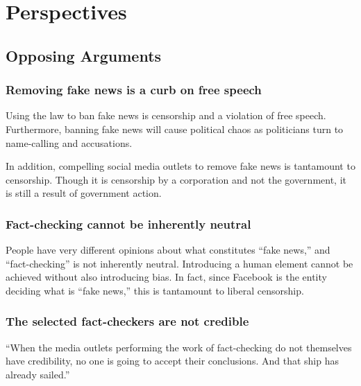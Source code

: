 
\section{Perspectives}

\subsection{Opposing Arguments}

\subsubsection{Removing fake news is a curb on free speech}

\par Using the law to ban fake news is censorship and a violation of free speech. Furthermore, banning fake news will cause political chaos as politicians turn to name-calling and accusations. \cite{eff_bill}
\par In addition, compelling social media outlets to remove fake news is tantamount to censorship. Though it is censorship by a corporation and not the government, it is still a result of government action. \cite{wp_germany}

\subsubsection{Fact-checking cannot be inherently neutral}

\par People have very different opinions about what constitute{}s ``fake news,'' and ``fact-checking'' is not inherently neutral. Introducing a human element cannot be achieved without also introducing bias. \cite{vox_sentences} In fact, since Facebook is the entity deciding what is ``fake news,'' this is tantamount to liberal censorship. \cite{milo_censor}

\subsubsection{The selected fact-checkers are not credible}

\par ``When the media outlets performing the work of fact-checking do not themselves have credibility, no one is going to accept their conclusions. And that ship has already sailed.'' \cite{vox_sentences}

